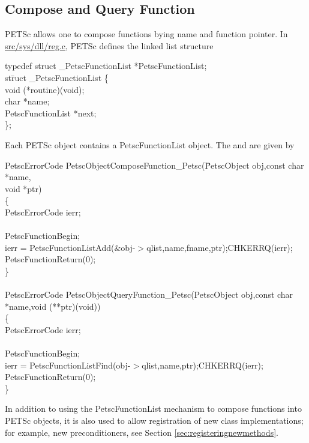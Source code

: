 \documentclass[twoside,12pt]{../sty/report_petsc}
\begin{document}
\subsection{Compose and Query Function}

PETSc allows one to compose functions bying name and function pointer. In \href{http://www.mcs.anl.gov/petsc/petsc-master/src/sys/dll/reg.c.html}{src/sys/dll/reg.c},
PETSc defines the linked list structure

\begin{tabbing}
typedef struct \_PetscFunctionList *PetscFunctionList;\\
st\=ruct \_PetscFunctionList \{\\
 \>void   (*routine)(void);\\
 \>char   *name;  \\
 \>PetscFunctionList  *next;\\
\};
\end{tabbing}

Each PETSc object contains a PetscFunctionList object. The  and
 are given by

\begin{tabbing}
PetscErrorCode PetscObjectComposeFunction\_Petsc(\=PetscObject obj,const char *name,\\
   \> void *ptr)\\
\{\\
  PetscErrorCode ierr;\\
\\
  PetscFunctionBegin;\\
  ierr = PetscFunctionListAdd(\&obj-$>$qlist,name,fname,ptr);CHKERRQ(ierr);\\
  PetscFunctionReturn(0);\\
\}\\
\\
PetscErrorCode PetscObjectQueryFunction\_Petsc(PetscObject obj,const char *name,void (**ptr)(void))\\
\{\\
  PetscErrorCode ierr;\\
\\
  PetscFunctionBegin;\\
  ierr = PetscFunctionListFind(obj-$>$qlist,name,ptr);CHKERRQ(ierr);\\
  PetscFunctionReturn(0);\\
\}
\end{tabbing}

In addition to using the PetscFunctionList mechanism to compose functions into PETSc objects, it is
also used to allow registration of new class implementations; for example, new
preconditioners, see Section \ref{sec:registeringnewmethods}.
\end{document}
